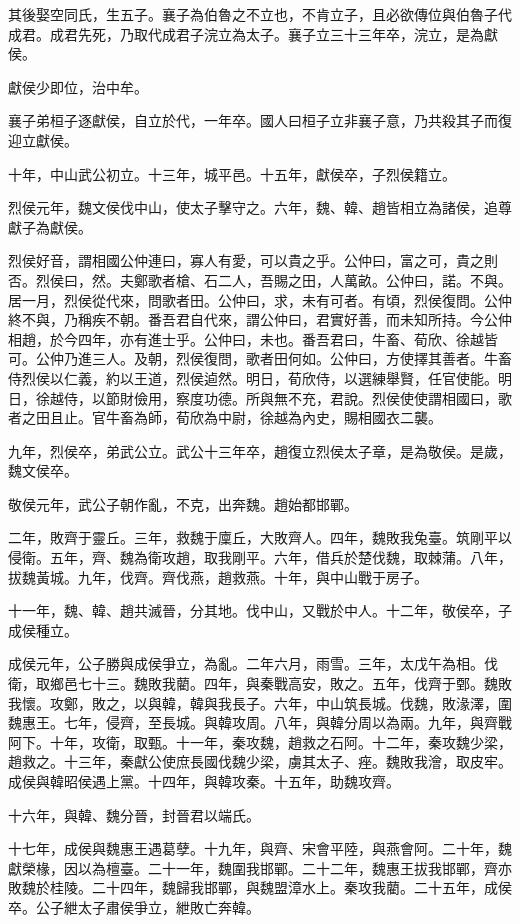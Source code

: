 其後娶空同氏，生五子。襄子為伯魯之不立也，不肯立子，且必欲傳位與伯魯子代成君。成君先死，乃取代成君子浣立為太子。襄子立三十三年卒，浣立，是為獻侯。

獻侯少即位，治中牟。

襄子弟桓子逐獻侯，自立於代，一年卒。國人曰桓子立非襄子意，乃共殺其子而復迎立獻侯。

十年，中山武公初立。十三年，城平邑。十五年，獻侯卒，子烈侯籍立。

烈侯元年，魏文侯伐中山，使太子擊守之。六年，魏、韓、趙皆相立為諸侯，追尊獻子為獻侯。

烈侯好音，謂相國公仲連曰，寡人有愛，可以貴之乎。公仲曰，富之可，貴之則否。烈侯曰，然。夫鄭歌者槍、石二人，吾賜之田，人萬畝。公仲曰，諾。不與。居一月，烈侯從代來，問歌者田。公仲曰，求，未有可者。有頃，烈侯復問。公仲終不與，乃稱疾不朝。番吾君自代來，謂公仲曰，君實好善，而未知所持。今公仲相趙，於今四年，亦有進士乎。公仲曰，未也。番吾君曰，牛畜、荀欣、徐越皆可。公仲乃進三人。及朝，烈侯復問，歌者田何如。公仲曰，方使擇其善者。牛畜侍烈侯以仁義，約以王道，烈侯逌然。明日，荀欣侍，以選練舉賢，任官使能。明日，徐越侍，以節財儉用，察度功德。所與無不充，君說。烈侯使使謂相國曰，歌者之田且止。官牛畜為師，荀欣為中尉，徐越為內史，賜相國衣二襲。

九年，烈侯卒，弟武公立。武公十三年卒，趙復立烈侯太子章，是為敬侯。是歲，魏文侯卒。

敬侯元年，武公子朝作亂，不克，出奔魏。趙始都邯鄲。

二年，敗齊于靈丘。三年，救魏于廩丘，大敗齊人。四年，魏敗我兔臺。筑剛平以侵衛。五年，齊、魏為衛攻趙，取我剛平。六年，借兵於楚伐魏，取棘蒲。八年，拔魏黃城。九年，伐齊。齊伐燕，趙救燕。十年，與中山戰于房子。

十一年，魏、韓、趙共滅晉，分其地。伐中山，又戰於中人。十二年，敬侯卒，子成侯種立。

成侯元年，公子勝與成侯爭立，為亂。二年六月，雨雪。三年，太戊午為相。伐衛，取鄉邑七十三。魏敗我藺。四年，與秦戰高安，敗之。五年，伐齊于鄄。魏敗我懷。攻鄭，敗之，以與韓，韓與我長子。六年，中山筑長城。伐魏，敗湪澤，圍魏惠王。七年，侵齊，至長城。與韓攻周。八年，與韓分周以為兩。九年，與齊戰阿下。十年，攻衛，取甄。十一年，秦攻魏，趙救之石阿。十二年，秦攻魏少梁，趙救之。十三年，秦獻公使庶長國伐魏少梁，虜其太子、痤。魏敗我澮，取皮牢。成侯與韓昭侯遇上黨。十四年，與韓攻秦。十五年，助魏攻齊。

十六年，與韓、魏分晉，封晉君以端氏。

十七年，成侯與魏惠王遇葛孽。十九年，與齊、宋會平陸，與燕會阿。二十年，魏獻榮椽，因以為檀臺。二十一年，魏圍我邯鄲。二十二年，魏惠王拔我邯鄲，齊亦敗魏於桂陵。二十四年，魏歸我邯鄲，與魏盟漳水上。秦攻我藺。二十五年，成侯卒。公子紲太子肅侯爭立，紲敗亡奔韓。

